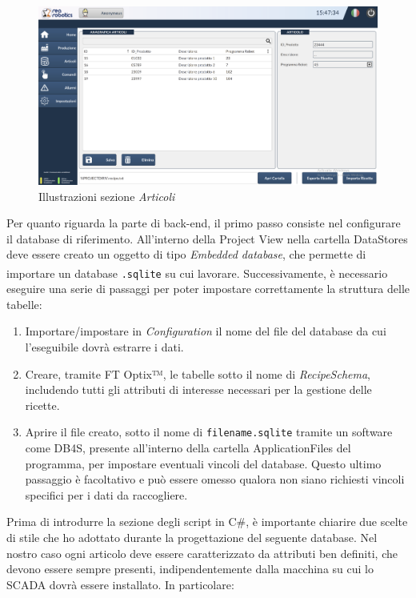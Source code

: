 \begin{figure} 
    \centering
    \includegraphics[width=1\linewidth]{Immagini/AnagraficaArticoli.png}
    \caption{Illustrazioni sezione \textit{Articoli}}
    \label{fig:AnagraficaArticoli.png}
\end{figure}

Per quanto riguarda la parte di back-end, il primo passo consiste nel configurare il database di riferimento. All'interno della Project View nella cartella DataStores deve essere creato un oggetto di tipo \textit{Embedded database}, che permette di importare un database \verb|.sqlite| su cui lavorare\textsuperscript{\cite{rockwelloptixdatastore}}. Successivamente, è necessario eseguire una serie di passaggi per poter impostare correttamente la struttura delle tabelle:

\begin{enumerate}
    \item Importare/impostare in \textit{Configuration} il nome del file del database da cui l'eseguibile dovrà estrarre i dati.
    \item Creare, tramite FT Optix™, le tabelle sotto il nome di \textit{RecipeSchema}, includendo tutti gli attributi di interesse necessari per la gestione delle ricette.
    \item Aprire il file creato, sotto il nome di \verb|filename.sqlite| tramite un software come DB4S, presente all'interno della cartella ApplicationFiles del programma, per impostare eventuali vincoli del database. Questo ultimo passaggio è facoltativo e può essere omesso qualora non siano richiesti vincoli specifici per i dati da raccogliere.
\end{enumerate} 

Prima di introdurre la sezione degli script in C\#, è importante chiarire due scelte di stile che ho adottato durante la progettazione del seguente database. Nel nostro caso ogni articolo deve essere caratterizzato da attributi ben definiti, che devono essere sempre presenti, indipendentemente dalla macchina su cui lo SCADA dovrà essere installato. In particolare:


